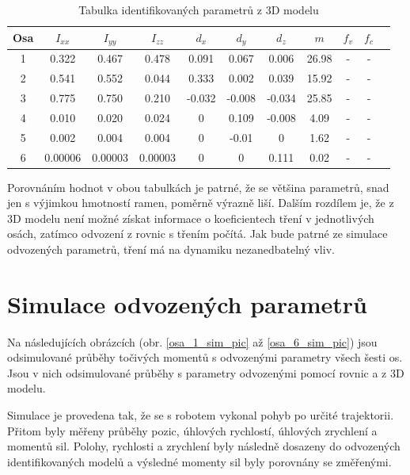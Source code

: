 \begin{table}[htbp]
  \centering
  \caption{Tabulka identifikovaných parametrů z 3D modelu}
    \begin{tabular}{c|cccccccccc}
    \multicolumn{1}{c|}{Osa} & \multicolumn{1}{c}{$I_{xx}$} & \multicolumn{1}{c}{$I_{yy}$} & \multicolumn{1}{c}{$I_{zz}$} & \multicolumn{1}{c}{$d_x$} & \multicolumn{1}{c}{$d_y$} & \multicolumn{1}{c}{$d_z$} & \multicolumn{1}{c}{$m$} & \multicolumn{1}{c}{$f_v$} & \multicolumn{1}{c}{$f_c$} \\
    \hline
    1  & 0.322   & 0.467   & 0.478   & 0.091 & 0.067 & 0.006 & 26.98 & - & - \\
    2  & 0.541   & 0.552   & 0.044   & 0.333 & 0.002 & 0.039 & 15.92 & - & - \\
    3  & 0.775   & 0.750   & 0.210   &-0.032 &-0.008 &-0.034 & 25.85 & - & - \\
    4  & 0.010   & 0.020   & 0.024   & 0     & 0.109 &-0.008 & 4.09  & - & - \\
    5  & 0.002   & 0.004   & 0.004   & 0     &-0.01  & 0     & 1.62  & - & - \\
    6  & 0.00006 & 0.00003 & 0.00003 & 0     & 0     & 0.111 & 0.02  & - & - \\
    \end{tabular}%
  \label{tab_ind_hodnot_3d}%
\end{table}%

Porovnáním hodnot v obou tabulkách je patrné, že se většina parametrů, snad jen s výjimkou hmotností ramen, poměrně výrazně liší. Dalším rozdílem je, že z 3D modelu není možné získat informace o koeficientech tření v jednotlivých osách, zatímco odvození z rovnic s třením počítá. Jak bude patrné ze simulace odvozených parametrů, tření má na dynamiku nezanedbatelný vliv.

\section{Simulace odvozených parametrů}

Na následujících obrázcích (obr. \ref{osa_1_sim_pic} až \ref{osa_6_sim_pic}) jsou odsimulované průběhy točivých momentů s odvozenými parametry všech šesti os. Jsou v nich odsimulované průběhy s parametry odvozenými pomocí rovnic a z 3D modelu. 

Simulace je provedena tak, že se s robotem vykonal pohyb po určité trajektorii. Přitom byly měřeny průběhy pozic, úhlových rychlostí, úhlových zrychlení a momentů sil. Polohy, rychlosti a zrychlení byly následně dosazeny do odvozených identifikovaných modelů a výsledné momenty sil byly porovnány se změřenými.

